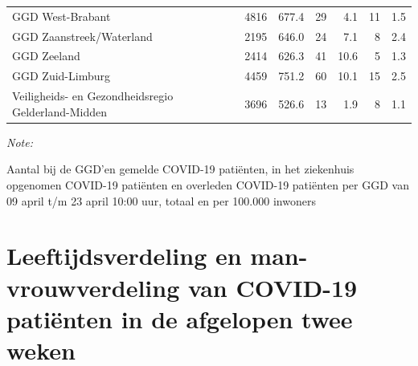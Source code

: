\documentclass[
  english,
  man,floatsintext]{apa6}
\begin{document}
\begin{table}
\begin{threeparttable}
\begin{tabular}{lrrrrrr}
GGD West-Brabant & 4816 & 677.4 & 29 & 4.1 & 11 & 1.5\\
GGD Zaanstreek/Waterland & 2195 & 646.0 & 24 & 7.1 & 8 & 2.4\\
GGD Zeeland & 2414 & 626.3 & 41 & 10.6 & 5 & 1.3\\
GGD Zuid-Limburg & 4459 & 751.2 & 60 & 10.1 & 15 & 2.5\\
Veiligheids- en Gezondheidsregio Gelderland-Midden & 3696 & 526.6 & 13 & 1.9 & 8 & 1.1\\
\bottomrule
\end{tabular}
\begin{tablenotes}
\item \textit{Note: } 
\item Aantal bij de GGD’en gemelde COVID-19 patiënten, in het ziekenhuis opgenomen COVID-19 patiënten en overleden COVID-19 patiënten per GGD van 09 april t/m 23 april 10:00 uur, totaal en per 100.000 inwoners
\end{tablenotes}
\end{threeparttable}
\endgroup{}
\end{table}

\newpage

\hypertarget{leeftijdsverdeling-en-man-vrouwverdeling-van-covid-19-patiuxebnten-in-de-afgelopen-twee-weken}{%
\section{Leeftijdsverdeling en man-vrouwverdeling van COVID-19 patiënten in de afgelopen twee weken}\label{leeftijdsverdeling-en-man-vrouwverdeling-van-covid-19-patiuxebnten-in-de-afgelopen-twee-weken}}
\end{document}
